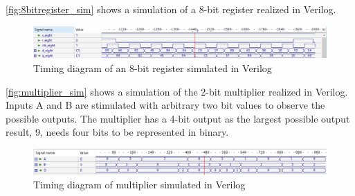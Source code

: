 \autoref{fig:8bitregister_sim} shows a simulation of a 8-bit register realized in Verilog.

\begin{figure}[H]
    \centering
    \includegraphics[width=\textwidth]{Figures/VerilogPlot_8bitreg.png}
    \caption{Timing diagram of an 8-bit register simulated in Verilog}
    \label{fig:8bitregister_sim}
\end{figure}

\autoref{fig:multiplier_sim} shows a simulation of the 2-bit multiplier realized in Verilog. Inputs A and B are stimulated with arbitrary two bit values to observe the possible outputs. The multiplier has a 4-bit output as the largest possible output result, 9, needs four bits to be represented in binary.

\begin{figure}[H]
    \centering
    \includegraphics[width=\textwidth]{Figures/Test of multiplier.png}
    \caption{Timing diagram of multiplier simulated in Verilog}
    \label{fig:multiplier_sim}
\end{figure}





